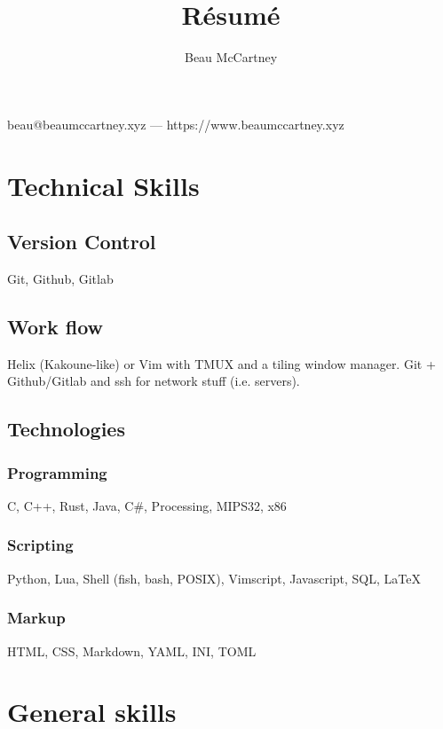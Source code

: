 \documentclass{article}
\makeatletter
\renewcommand{\maketitle}{
\begin{center}
{\huge\bfseries
\theauthor}

\vspace{.25em}

beau@beaumccartney.xyz --- https://www.beaumccartney.xyz

\end{center}
}
\makeatother
\begin{document}
\title{R\'esum\'e}
\author{Beau McCartney}

\maketitle

\section{Technical Skills}

\subsection{Version Control}

Git, Github, Gitlab

\subsection{Work flow}

Helix (Kakoune-like) or Vim with TMUX and a tiling window manager. Git +
Github/Gitlab and ssh for network stuff (i.e. servers).

\subsection{Technologies}

\subsubsection{Programming}

C, C++, Rust, Java, C\#, Processing, MIPS32, x86

\subsubsection{Scripting}

Python, Lua, Shell (fish, bash, POSIX), Vimscript, Javascript, SQL, \LaTeX

\subsubsection{Markup}

HTML, CSS, Markdown, YAML, INI, TOML

\section{General skills}
\end{document}
